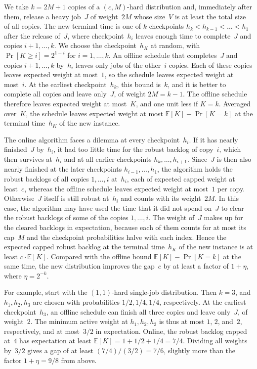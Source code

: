\documentclass[11pt,letterpaper]{article}
\makeatletter
\renewcommand\paragraph{\@startsection{paragraph}{4}{\z@}{\parskip}{-1em}{\normalfont\normalsize\bfseries}}
\theoremstyle{definition}
\theoremstyle{remark}
\newcommand{\E}{\mathbb{E}}
\makeatother
\begin{document}
\paragraph{Amplification.}
We take $k=2M+1$ copies of a $(c,M)$-hard distribution and, immediately after them, release a heavy job~$J$ of weight~$2M$ whose size~$V$ is at least the total size of all copies. The new terminal time is one of $k$ checkpoints $h_k<h_{k-1}<\dots<h_1$ after the release of~$J$, where checkpoint~$h_i$ leaves enough time to complete~$J$ and copies $i+1,\dots,k$. We choose the checkpoint~$h_K$ at random, with $\Pr[K\ge i]=2^{1-i}$ for $i=1,\dots,k$. An offline schedule that completes~$J$ and copies $i+1,\dots,k$ by~$h_i$ leaves only jobs of the other~$i$ copies. Each of these copies leaves expected weight at most~$1$, so the schedule leaves expected weight at most~$i$. At the earliest checkpoint~$h_k$, this bound is~$k$, and it is better to complete all copies and leave only~$J$, of weight $2M=k-1$. The offline schedule therefore leaves expected weight at most~$K$, and one unit less if $K=k$. Averaged over~$K$, the schedule leaves expected weight at most $\E[K]-\Pr[K=k]$ at the terminal time~$h_K$ of the new instance.

The online algorithm faces a dilemma at every checkpoint~$h_i$. If it has nearly finished~$J$ by~$h_i$, it had too little time for the robust backlog of copy~$i$, which then survives at~$h_i$ and at all earlier checkpoints $h_k,\dots,h_{i+1}$. Since~$J$ is then also nearly finished at the later checkpoints $h_{i-1},\dots,h_1$, the algorithm holds the robust backlogs of all copies $1,\dots,i$ at~$h_i$, each of expected capped weight at least~$c$, whereas the offline schedule leaves expected weight at most~$1$ per copy. Otherwise~$J$ itself is still robust at~$h_i$ and counts with its weight~$2M$. In this case, the algorithm may have used the time that it did not spend on~$J$ to clear the robust backlogs of some of the copies $1,\dots,i$. The weight of~$J$ makes up for the cleared backlogs in expectation, because each of them counts for at most its cap~$M$ and the checkpoint probabilities halve with each index. Hence the expected capped robust backlog at the terminal time~$h_K$ of the new instance is at least $c\cdot\E[K]$. Compared with the offline bound $\E[K]-\Pr[K=k]$ at the same time, the new distribution improves the gap~$c$ by at least a factor of $1+\eta$, where $\eta=2^{-k}$.

For example, start with the $(1,1)$-hard single-job distribution. Then $k=3$, and $h_1,h_2,h_3$ are chosen with probabilities $1/2,1/4,1/4$, respectively. At the earliest checkpoint~$h_3$, an offline schedule can finish all three copies and leave only~$J$, of weight~$2$. The minimum active weight at $h_1,h_2,h_3$ is thus at most $1$, $2$, and~$2$, respectively, and at most~$3/2$ in expectation. Online, the robust backlog capped at~$4$ has expectation at least $\E[K]=1+1/2+1/4=7/4$. Dividing all weights by~$3/2$ gives a gap of at least $(7/4)/(3/2)=7/6$, slightly more than the factor $1+\eta=9/8$ from above.
\end{document}
